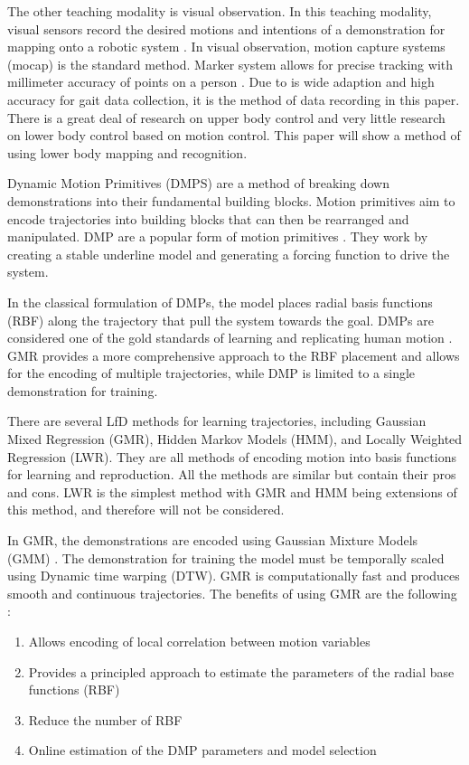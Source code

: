 The other teaching modality is visual observation. In this teaching modality, visual sensors record the desired motions and intentions of a demonstration for mapping onto a robotic system \cite{CalinonLee19}. In visual observation, motion capture systems (mocap) is the standard method. Marker system allows for precise tracking with millimeter accuracy of points on a person \cite{ott2008motion}. Due to is wide adaption and high accuracy for gait data collection\cite{ViconGaiting}, it is the method of data recording in this paper. There is a great deal of research on upper body control and very little research on lower body control based on motion control. This paper will show a method of using lower body mapping and recognition. 

Dynamic Motion Primitives (DMPS) are a method of breaking down demonstrations into their fundamental building blocks. Motion primitives aim to encode trajectories into building blocks that can then be rearranged and manipulated. DMP are a popular form of motion primitives \cite{ijspeert2013dynamical}. They work by creating a stable underline model and generating a forcing function to drive the system.  

In the classical formulation of DMPs, the model places radial basis functions (RBF) along the trajectory that pull the system towards the goal. DMPs are considered one of the gold standards of learning and replicating human motion \cite{nakanishi2004learning}. GMR provides a more comprehensive approach to the RBF placement and allows for the encoding of multiple trajectories, while DMP is limited to a single demonstration for training. 

There are several LfD methods for learning trajectories, including Gaussian Mixed Regression (GMR), Hidden Markov Models (HMM), and Locally Weighted Regression (LWR). They are all methods of encoding motion into basis functions for learning and reproduction. All the methods are similar but contain their pros and cons. LWR is the simplest method with GMR and HMM being extensions of this method, and therefore will not be considered.

In GMR, the demonstrations are encoded using Gaussian Mixture Models (GMM)\cite{calinon2013compliant} \cite{Statisticaldynamical}. The demonstration for training the model must be temporally scaled using Dynamic time warping (DTW).  GMR is computationally fast and produces smooth and continuous trajectories.  The benefits of using GMR are the following \cite{Calinon}: 

\begin{enumerate}  
    \item Allows encoding of local correlation between motion variables   
    \item Provides a principled approach to estimate the parameters of the radial base functions (RBF)  

    \item Reduce the number of RBF   
    \item Online estimation of the DMP parameters and model selection   
\end{enumerate}  

